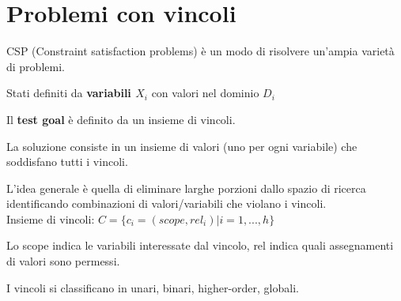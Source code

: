 \newpage

\section{Problemi con vincoli}

CSP (Constraint satisfaction problems) è un modo di risolvere un'ampia varietà di problemi.

Stati definiti da \textbf{ variabili $X_i$ } con valori nel dominio $D_i$

Il \textbf{test goal} è definito da un insieme di vincoli.

La {soluzione} consiste in un insieme di valori (uno per ogni variabile) che
soddisfano tutti i vincoli.

L'idea generale è quella di eliminare larghe porzioni dallo spazio di ricerca
identificando combinazioni di valori/variabili che violano i vincoli.\\

Insieme di vincoli: $C = \{ c_i = (scope,rel_i) | i=1,...,h\}$

Lo scope indica le variabili interessate dal vincolo, rel indica quali
assegnamenti di valori sono permessi.

I vincoli si classificano in unari, binari, higher-order, globali.




